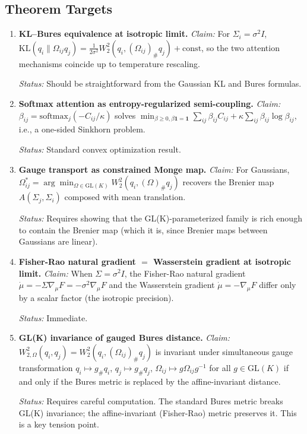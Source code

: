 \documentclass[11pt]{article}
\newcommand{\KL}{\mathrm{KL}}
\newcommand{\GL}{\mathrm{GL}}
\begin{document}
\subsection{Theorem Targets}

\begin{enumerate}

\item \textbf{KL--Bures equivalence at isotropic limit.}
\emph{Claim:} For $\Sigma_i = \sigma^2 I$, $\KL(q_i \| \Omega_{ij}q_j) = \frac{1}{2\sigma^2}W_2^2(q_i, (\Omega_{ij})_\#q_j) + \text{const}$, so the two attention mechanisms coincide up to temperature rescaling.

\emph{Status:} Should be straightforward from the Gaussian KL and Bures formulas.

\item \textbf{Softmax attention as entropy-regularized semi-coupling.}
\emph{Claim:} $\beta_{ij} = \text{softmax}_j(-C_{ij}/\kappa)$ solves $\min_{\beta \geq 0, \beta\mathbf{1}=\mathbf{1}} \sum_{ij}\beta_{ij}C_{ij} + \kappa\sum_{ij}\beta_{ij}\log\beta_{ij}$, i.e., a one-sided Sinkhorn problem.

\emph{Status:} Standard convex optimization result.

\item \textbf{Gauge transport as constrained Monge map.}
\emph{Claim:} For Gaussians, $\Omega_{ij}^* = \arg\min_{\Omega \in \GL(K)} W_2^2(q_i, (\Omega)_\#q_j)$ recovers the Brenier map $A(\Sigma_j, \Sigma_i)$ composed with mean translation.

\emph{Status:} Requires showing that the GL(K)-parameterized family is rich enough to contain the Brenier map (which it is, since Brenier maps between Gaussians are linear).

\item \textbf{Fisher-Rao natural gradient $=$ Wasserstein gradient at isotropic limit.}
\emph{Claim:} When $\Sigma = \sigma^2 I$, the Fisher-Rao natural gradient $\dot{\mu} = -\Sigma\nabla_\mu F = -\sigma^2\nabla_\mu F$ and the Wasserstein gradient $\dot{\mu} = -\nabla_\mu F$ differ only by a scalar factor (the isotropic precision).

\emph{Status:} Immediate.

\item \textbf{GL(K) invariance of gauged Bures distance.}
\emph{Claim:} $W_{2,\Omega}^2(q_i, q_j) = W_2^2(q_i, (\Omega_{ij})_\#q_j)$ is invariant under simultaneous gauge transformation $q_i \mapsto g_\#q_i$, $q_j \mapsto g_\#q_j$, $\Omega_{ij} \mapsto g\Omega_{ij}g^{-1}$ for all $g \in \GL(K)$ if and only if the Bures metric is replaced by the affine-invariant distance.

\emph{Status:} Requires careful computation. The standard Bures metric breaks GL(K) invariance; the affine-invariant (Fisher-Rao) metric preserves it. This is a key tension point.

\end{enumerate}
\end{document}

